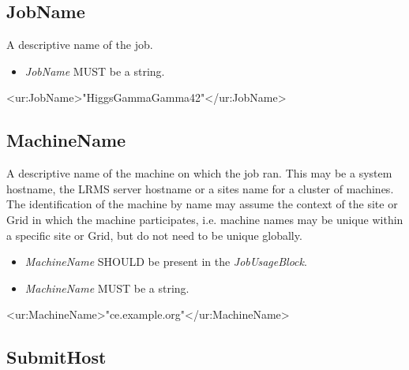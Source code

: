 


\subsection{JobName}

A descriptive name of the job. %

\begin{itemize}
\item \emph{JobName} MUST be a string.
\end{itemize}

\begin{XMLexample}
<ur:JobName>"HiggsGammaGamma42"</ur:JobName>
\end{XMLexample}






\subsection{MachineName} \label{JobMachineName}

A descriptive name of the machine on which the job ran. This may be a system hostname, the LRMS server hostname or a sites name for a cluster of machines. 
The identification of the machine by name may assume the context of the site or Grid in which the machine participates, i.e. machine
names may be unique within a specific site or Grid, but do not need to be unique globally.

\begin{itemize}
\item \emph{MachineName} SHOULD be present in the \emph{JobUsageBlock}.
\item \emph{MachineName} MUST be a string.
\end{itemize}

\begin{XMLexample}
<ur:MachineName>"ce.example.org"</ur:MachineName>
\end{XMLexample}






\subsection{SubmitHost} \label{JobSubmitHost}

